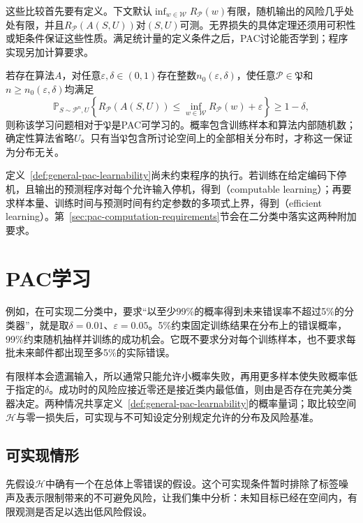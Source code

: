 这些比较首先要有定义。下文默认$\inf_{w\in\mathcal W}R_{\mathcal P}(w)$有限，随机输出的风险几乎处处有限，并且$R_{\mathcal P}(A(S,U))$对$(S,U)$可测。无界损失的具体定理还须用可积性或矩条件保证这些性质。满足统计量的定义条件之后，PAC讨论能否学到；程序实现另加计算要求。

\begin{definition}[相对于分布族的PAC可学习性]
\label{def:general-pac-learnability}
若存在算法$A$，对任意$\varepsilon,\delta\in(0,1)$存在整数$n_0(\varepsilon,\delta)$，使任意$\mathcal P\in\mathfrak P$和$n\geq n_0(\varepsilon,\delta)$均满足
\[
 \mathbb P_{S\sim\mathcal P^n,U}\!\left\{
 R_{\mathcal P}(A(S,U))\leq
 \inf_{w\in\mathcal W}R_{\mathcal P}(w)+\varepsilon
 \right\}\geq1-\delta,
\]
则称该学习问题相对于$\mathfrak P$是PAC可学习的。概率包含训练样本和算法内部随机数；确定性算法省略$U$。只有当$\mathfrak P$包含所讨论空间上的全部相关分布时，才称这一保证为分布无关。
\end{definition}

定义~\ref{def:general-pac-learnability}尚未约束程序的执行。若训练在给定编码下停机，且输出的预测程序对每个允许输入停机，得到（computable learning）；再要求样本量、训练时间与预测时间有约定参数的多项式上界，得到（efficient learning）。第~\ref{sec:pac-computation-requirements}节会在二分类中落实这两种附加要求。

\section{PAC学习}
\label{sec:pac-learning}

例如，在可实现二分类中，要求“以至少99\%的概率得到未来错误率不超过5\%的分类器”，就是取$\delta=0.01$、$\varepsilon=0.05$。5\%约束固定训练结果在分布上的错误概率，99\%约束随机抽样并训练的成功机会。它既不要求分对每个训练样本，也不要求每批未来邮件都出现至多5\%的实际错误。

有限样本会遗漏输入，所以通常只能允许小概率失败，再用更多样本使失败概率低于指定的$\delta$。成功时的风险应接近零还是接近类内最低值，则由是否存在完美分类器决定。两种情况共享定义~\ref{def:general-pac-learnability}的概率量词；取比较空间$\mathcal H$与零一损失后，可实现与不可知设定分别规定允许的分布及风险基准。

\subsection{可实现情形}

先假设$\mathcal H$中确有一个在总体上零错误的假设。这个可实现条件暂时排除了标签噪声及表示限制带来的不可避免风险，让我们集中分析：未知目标已经在空间内，有限观测是否足以选出低风险假设。

